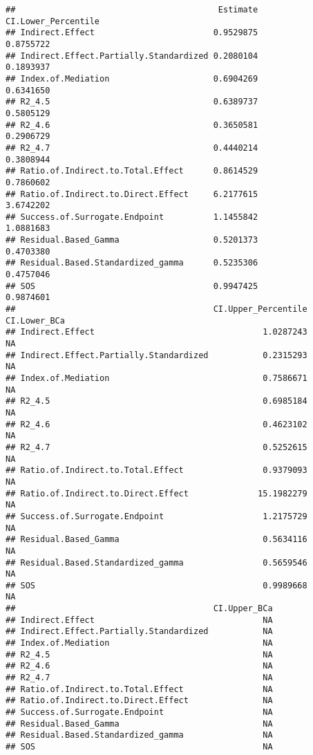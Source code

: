 \documentclass[
]{article}
\begin{document}
\begin{verbatim}
##                                         Estimate CI.Lower_Percentile
## Indirect.Effect                        0.9529875           0.8755722
## Indirect.Effect.Partially.Standardized 0.2080104           0.1893937
## Index.of.Mediation                     0.6904269           0.6341650
## R2_4.5                                 0.6389737           0.5805129
## R2_4.6                                 0.3650581           0.2906729
## R2_4.7                                 0.4440214           0.3808944
## Ratio.of.Indirect.to.Total.Effect      0.8614529           0.7860602
## Ratio.of.Indirect.to.Direct.Effect     6.2177615           3.6742202
## Success.of.Surrogate.Endpoint          1.1455842           1.0881683
## Residual.Based_Gamma                   0.5201373           0.4703380
## Residual.Based.Standardized_gamma      0.5235306           0.4757046
## SOS                                    0.9947425           0.9874601
##                                        CI.Upper_Percentile CI.Lower_BCa
## Indirect.Effect                                  1.0287243           NA
## Indirect.Effect.Partially.Standardized           0.2315293           NA
## Index.of.Mediation                               0.7586671           NA
## R2_4.5                                           0.6985184           NA
## R2_4.6                                           0.4623102           NA
## R2_4.7                                           0.5252615           NA
## Ratio.of.Indirect.to.Total.Effect                0.9379093           NA
## Ratio.of.Indirect.to.Direct.Effect              15.1982279           NA
## Success.of.Surrogate.Endpoint                    1.2175729           NA
## Residual.Based_Gamma                             0.5634116           NA
## Residual.Based.Standardized_gamma                0.5659546           NA
## SOS                                              0.9989668           NA
##                                        CI.Upper_BCa
## Indirect.Effect                                  NA
## Indirect.Effect.Partially.Standardized           NA
## Index.of.Mediation                               NA
## R2_4.5                                           NA
## R2_4.6                                           NA
## R2_4.7                                           NA
## Ratio.of.Indirect.to.Total.Effect                NA
## Ratio.of.Indirect.to.Direct.Effect               NA
## Success.of.Surrogate.Endpoint                    NA
## Residual.Based_Gamma                             NA
## Residual.Based.Standardized_gamma                NA
## SOS                                              NA
\end{verbatim}
\end{document}
